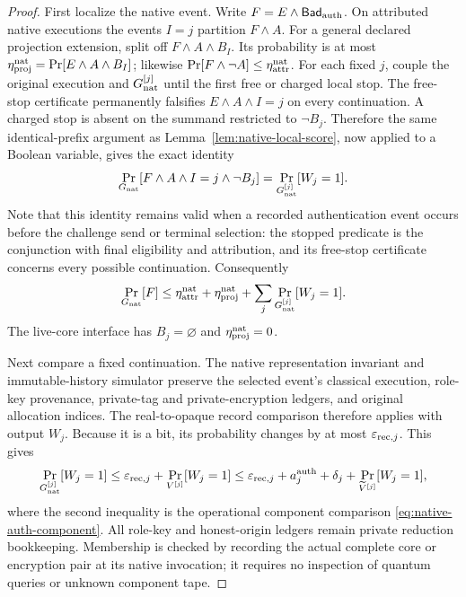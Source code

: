 \documentclass[pdflatex]{sn-jnl}
\theoremstyle{thmstyleone}
\theoremstyle{thmstylethree}
\theoremstyle{thmstyletwo}
\begin{document}
\begin{proof}
First localize the native event.  Write
$F=E\wedge\mathsf{Bad}_{\rm auth}$.  On attributed native executions the
events $I=j$ partition $F\wedge A$.  For a general declared projection
extension, split off $F\wedge A\wedge B_I$.  Its probability is at most
$\eta_{\rm proj}^{\rm nat}=\Pr[E\wedge A\wedge B_I]$; likewise
$\Pr[F\wedge\neg A]\le\eta_{\rm attr}^{\rm nat}$.
For each fixed $j$, couple the original execution and $G_{\rm nat}^{[j]}$
until the first free or charged local stop.  The free-stop certificate
permanently falsifies $E\wedge A\wedge I=j$ on every continuation.  A charged
stop is absent on the summand restricted to $\neg B_j$.  Therefore the same
identical-prefix argument as Lemma~\ref{lem:native-local-score}, now applied to a
Boolean variable, gives the exact identity
\[
 \Pr_{G_{\rm nat}}[F\wedge A\wedge I=j\wedge\neg B_j]
 =\Pr_{G_{\rm nat}^{[j]}}[W_j=1].
\]
Note that this identity remains valid when a recorded authentication event occurs
before the challenge send or terminal selection: the stopped predicate is the conjunction
with final eligibility and attribution, and its free-stop certificate
concerns every possible continuation.  Consequently
\begin{equation}
 \Pr_{G_{\rm nat}}[F]
 \le\eta_{\rm attr}^{\rm nat}+\eta_{\rm proj}^{\rm nat}
    +\sum_j\Pr_{G_{\rm nat}^{[j]}}[W_j=1].
 \label{eq:native-auth-localization}
\end{equation}
The live-core interface has $B_j=\varnothing$ and
$\eta_{\rm proj}^{\rm nat}=0$.

Next compare a fixed continuation.  The native representation invariant and
immutable-history simulator preserve the selected event's classical
execution, role-key provenance, private-tag and private-encryption ledgers,
and original allocation indices.  The real-to-opaque record comparison
therefore applies with output $W_j$.  Because it is a bit, its probability
changes by at most $\varepsilon_{{\rm rec},j}$.  This gives
\[
 \Pr_{G_{\rm nat}^{[j]}}[W_j=1]
 \le\varepsilon_{{\rm rec},j}
       +\Pr_{V^{[j]}}[W_j=1]
 \le\varepsilon_{{\rm rec},j}+a_j^{\rm auth}+\delta_j
       +\Pr_{\widetilde V^{[j]}}[W_j=1],
\]
where the second inequality is the operational component comparison
\eqref{eq:native-auth-component}.  All role-key and honest-origin ledgers
remain private reduction bookkeeping.  Membership is checked by recording
the actual complete core or encryption pair at its native invocation; it
requires no inspection of quantum queries or unknown component tape.


\end{proof}
\end{document}
